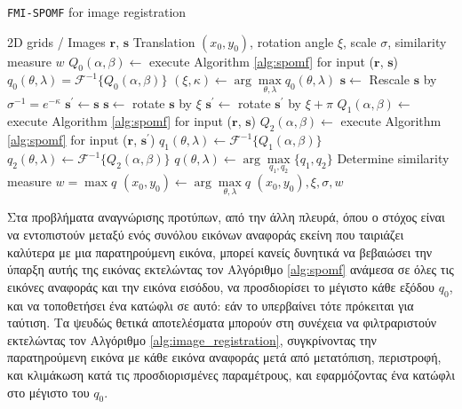 \begin{algorithm}
  \renewcommand{\arraystretch}{1.3}
  \caption{\texttt{FMI-SPOMF} for image registration}
  \label{alg:image_registration}
  \begin{spacing}{1.2}
  \begin{algorithmic}[1]
    \REQUIRE 2D grids / Images $\bm{r}$, $\bm{s}$
    \ENSURE Translation $(x_0,y_0)$, rotation angle $\xi$, scale $\sigma$, similarity measure $w$
    \STATE $Q_0(\alpha,\beta) \leftarrow$ execute Algorithm \ref{alg:spomf} for input ($\bm{r}$, $\bm{s}$)
    \STATE $q_0(\theta,\lambda) = \mathcal{F}^{-1}\{Q_0(\alpha, \beta)\}$
    \STATE $(\xi, \kappa) \leftarrow \arg\max\limits_{\theta,\lambda}{q_0(\theta, \lambda)}$
    \STATE $\bm{s} \leftarrow$ Rescale $\bm{s}$ by $\sigma^{-1} = e^{-\kappa}$
    \STATE $\bm{s}^{\prime} \leftarrow \bm{s}$
    \STATE $\bm{s} \leftarrow$          rotate $\bm{s}$ by $\xi$
    \STATE $\bm{s}^{\prime} \leftarrow$ rotate $\bm{s}^{\prime}$ by $\xi + \pi$
    \STATE $Q_1(\alpha,\beta) \leftarrow$ execute Algorithm \ref{alg:spomf} for input ($\bm{r}$, $\bm{s}$)
    \STATE $Q_2(\alpha,\beta) \leftarrow$ execute Algorithm \ref{alg:spomf} for input ($\bm{r}$, $\bm{s}^{\prime}$)
    \STATE $q_1(\theta,\lambda) \leftarrow \mathcal{F}^{-1}\{Q_1(\alpha, \beta)\}$
    \STATE $q_2(\theta,\lambda) \leftarrow \mathcal{F}^{-1}\{Q_2(\alpha, \beta)\}$
    \STATE $q(\theta,\lambda) \leftarrow \arg\max\limits_{q_1,q_2}\{q_1, q_2\}$
    \STATE Determine similarity measure $w = \max q$
    \STATE $(x_0,y_0) \leftarrow \arg\max\limits_{\theta,\lambda}{q}$
    \RETURN $(x_0,y_0), \xi, \sigma, w$
  \end{algorithmic}
  \end{spacing}
\end{algorithm}

Στα προβλήματα αναγνώρισης προτύπων, από την άλλη πλευρά, όπου ο στόχος είναι
να εντοπιστούν μεταξύ ενός συνόλου εικόνων αναφοράς εκείνη που ταιριάζει
καλύτερα με μια παρατηρούμενη εικόνα, μπορεί κανείς δυνητικά να βεβαιώσει την
ύπαρξη αυτής της εικόνας εκτελώντας τον Αλγόριθμο \ref{alg:spomf} ανάμεσα σε
όλες τις εικόνες αναφοράς και την εικόνα εισόδου, να προσδιορίσει το μέγιστο
κάθε εξόδου $q_0$, και να τοποθετήσει ένα κατώφλι σε αυτό: εάν το υπερβαίνει
τότε πρόκειται για ταύτιση. Τα ψευδώς θετικά αποτελέσματα μπορούν στη συνέχεια
να φιλτραριστούν εκτελώντας τον Αλγόριθμο \ref{alg:image_registration},
συγκρίνοντας την παρατηρούμενη εικόνα με κάθε εικόνα αναφοράς μετά από
μετατόπιση, περιστροφή, και κλιμάκωση κατά τις προσδιορισμένες παραμέτρους, και
εφαρμόζοντας ένα κατώφλι στο μέγιστο του $q_0$.



